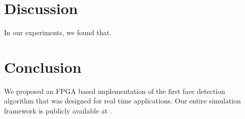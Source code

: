 \documentclass[conference]{IEEEtran}
\begin{document}



\section {Discussion}
\label{discussion_section}


In our experiments, we found that. 




\section {Conclusion}


We proposed an FPGA based implementation of the first face detection algorithm that was designed for real time applications. 
Our entire simulation framework is publicly available at \cite{dejazzer-software}.


\end{document}
